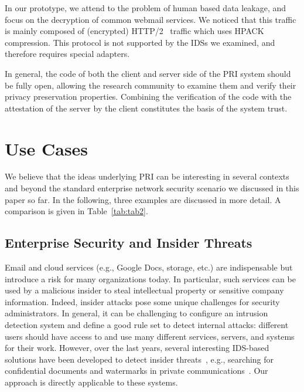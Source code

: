 \documentclass{sig-alternate-10pt}
\newcommand{\sys}{PRI\xspace}
\begin{document}
In our prototype, we attend to the problem of 
human based data leakage, 
and focus
on the decryption  of common webmail services. 
We noticed that this traffic is mainly composed of 
(encrypted) HTTP/2~\cite{http2} traffic which uses HPACK compression. 
This protocol is not supported by the IDSs we examined, and therefore requires 
special adapters.

In general, the code of both the client and server side of the \sys system should be 
fully open, 
allowing the research community to examine them and verify their privacy 
preservation properties. Combining the verification of the code 
with the attestation of the server by the client 
constitutes the basis of the system trust.

\section{Use Cases}\label{sec:use-cases}

We believe that the ideas underlying \sys can be interesting in
several contexts and beyond the standard enterprise network 
security scenario we discussed in this paper so far.
In the following, three examples are discussed in more detail.
A comparison is given in Table~\ref{tab:tab2}.


\subsection{Enterprise Security and Insider Threats}

Email and cloud services (e.g., Google Docs, storage, etc.) are indispensable but introduce
a risk for many organizations today. In particular, such 
services can be used by a malicious
insider to steal intellectual property or sensitive company information. 
Indeed, insider attacks pose some unique challenges for security administrators.
In general, it can be challenging to configure an intrusion detection
system and define a good rule set to detect internal attacks: 
different users should have access to and use many different services, servers, 
and systems for their work. 
However, over the last years, several interesting IDS-based solutions have
been developed to detect insider threats~\cite{insi-3}, 
e.g., searching for confidential 
documents and watermarks in private communications~\cite{encryptedweb}.
 Our approach is directly applicable to these systems. 
 
\end{document}
